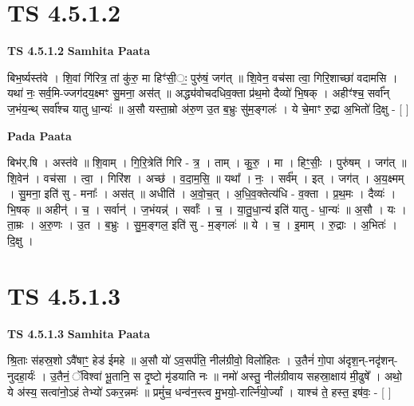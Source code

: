 \documentclass[17pt]{extarticle}
\begin{document}
\section{ TS 4.5.1.2 }

\textbf{TS 4.5.1.2 } \newline
\textbf{Samhita Paata} \newline

बिभ॒र्ष्यस्त॑वे । शि॒वां गि॑रित्र॒ तां कु॑रु॒ मा हिꣳ॑सी॒ः॒ पुरु॑षं॒ जग॑त् ॥        शि॒वेन॒ वच॑सा त्वा॒ गिरि॒शाच्छा॑ वदामसि ।यथा॑ नः॒ सर्व॒मि-ज्जग॑दय॒क्ष्मꣳ सु॒मना॒ अस॑त् ॥                             अद्ध्य॑वोचदधिव॒क्ता प्र॑थ॒मो दैव्यो॑ भि॒षक् । अहीꣳ॑श्च॒॒ सर्वा᳚न् ज॒भंय॒न्थ् सर्वा᳚श्च यातु धा॒न्यः॑ ॥                          अ॒सौ यस्ता॒म्रो अ॑रु॒ण उ॒त ब॒भ्रुः सु॑म॒ङ्गलः॑ । ये चे॒माꣳ रु॒द्रा अ॒भितो॑ दि॒क्षु - [  ] \newline

\textbf{Pada Paata} \newline

बिभ॑र्.षि । अस्त॑वे ॥ शि॒वाम् । गि॒रि॒त्रेति॑ गिरि - त्र॒ । ताम् । कु॒रु॒ । मा । हिꣳ॒॒सीः॒ । पुरु॑षम् । जग॑त् ॥ शि॒वेन॑ । वच॑सा । त्वा॒ । गिरि॑श । अच्छ॑ । व॒दा॒म॒सि॒ ॥ यथा᳚ । नः॒ । सर्व᳚म् । इत् । जग॑त् । अ॒य॒क्ष्मम् । सु॒मना॒ इति॑ सु - मनाः᳚ । अस॑त् ॥ अधीति॑ । अ॒वो॒च॒त् । अ॒धि॒व॒क्तेत्य॑धि - व॒क्ता । प्र॒थ॒मः । दैव्यः॑ । भि॒षक् ॥ अहीन्॑ । च॒ । सर्वान्॑ । ज॒भंयन्न्॑ । सर्वाः᳚ । च॒ । या॒तु॒धा॒न्य॑ इति॑ यातु - धा॒न्यः॑ ॥ अ॒सौ । यः । ता॒म्रः । अ॒रु॒णः । उ॒त । ब॒भ्रुः । सु॒म॒ङ्गल॒ इति॑ सु - म॒ङ्गलः॑ ॥ ये । च॒ । इ॒माम् । रु॒द्राः । अ॒भितः॑ । दि॒क्षु ।  \newline





\section{ TS 4.5.1.3 }

\textbf{TS 4.5.1.3 } \newline
\textbf{Samhita Paata} \newline

श्रि॒ताः स॑हस्र॒शो ऽवै॑षाꣳ॒॒ हेड॑ ईमहे ॥ अ॒सौ यो॑ ऽव॒सर्प॑ति॒ नील॑ग्रीवो॒ विलो॑हितः । उ॒तैनं॑ गो॒पा अ॑दृश॒न्-नदृ॑शन्-नुदहा॒र्यः॑ । उ॒तैनं॒ ॅविश्वा॑ भू॒तानि॒ स दृ॒ष्टो मृ॑डयाति नः ॥                               नमो॑ अस्तु॒ नील॑ग्रीवाय सहस्रा॒क्षाय॑ मी॒ढुषे᳚ । अथो॒ ये अ॑स्य॒ सत्वा॑नो॒ऽहं तेभ्यो॑ ऽकर॒न्नमः॑ ॥                                   प्रमुं॑च॒ धन्व॑न॒स्त्व मु॒भयो॒-रार्त्नि॑यो॒र्ज्यां । याश्च॑ ते॒ हस्त॒ इष॑वः॒ - [  ] \newline
\end{document}
